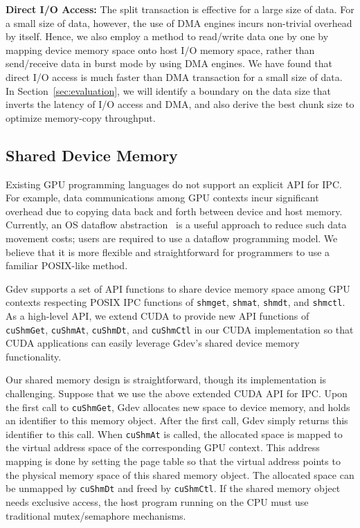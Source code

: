 \textbf{Direct I/O Access:}
The split transaction is effective for a large size of data.
For a small size of data, however, the use of DMA engines incurs
non-trivial overhead by itself.
Hence, we also employ a method to read/write data one by one by mapping
device memory space onto host I/O memory space, rather than send/receive
data in burst mode by using DMA engines.
We have found that direct I/O access is much faster than DMA transaction
for a small size of data.
In Section~\ref{sec:evaluation}, we will identify a boundary on the data
size that inverts the latency of I/O access and DMA, and also derive the
best chunk size to optimize memory-copy throughput.

\vspace{-0.25em}
\subsection{Shared Device Memory}
\label{sec:shared_memory}
\vspace{-0.25em}

Existing GPU programming languages do not support an explicit API
for IPC.
For example, data communications among GPU contexts incur significant
overhead due to copying data back and forth between device and host
memory.
Currently, an OS dataflow abstraction~\cite{Rossbach_SOSP11} is a useful
approach to reduce such data movement costs; users are required to use a
dataflow programming model.
We believe that it is more flexible and straightforward for programmers to
use a familiar POSIX-like method.

Gdev supports a set of API functions to share device memory space
among GPU contexts respecting POSIX IPC functions of \texttt{shmget},
\texttt{shmat}, \texttt{shmdt}, and \texttt{shmctl}.
As a high-level API, we extend CUDA  to provide new API functions of
\texttt{cuShmGet}, \texttt{cuShmAt}, \texttt{cuShmDt}, and
\texttt{cuShmCtl} in our CUDA implementation so that CUDA
applications can easily leverage Gdev's shared device memory
functionality.

Our shared memory design is straightforward, though its implementation
is challenging.
Suppose that we use the above extended CUDA API for IPC.
Upon the first call to \texttt{cuShmGet}, Gdev allocates new space to
device memory, and holds an identifier to this memory object. 
After the first call, Gdev simply returns this identifier to this call.
When \texttt{cuShmAt} is called, the allocated space is mapped to the
virtual address space of the corresponding GPU context.
This address mapping is done by setting the page table so that the
virtual address points to the physical memory space of this shared
memory object.
The allocated space can be unmapped by \texttt{cuShmDt} and freed by
\texttt{cuShmCtl}. 
If the shared memory object needs exclusive access, the host program
running on the CPU must use traditional mutex/semaphore mechanisms.

